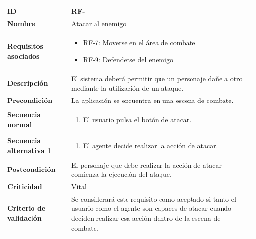 \begin{center}
	\begin{tabular}{ | p{4.7cm} | p{10cm} | } 
		\hline
		
		\textbf{ID} & RF-\arabic{contador_requisitos_funcionales}
		{contador_requisitos_funcionales} \\
		
		\hline 
		\textbf{Nombre} &
		Atacar al enemigo\\ 
		
		\hline
		\textbf{Requisitos asociados} & 
		\begin{itemize}
			\item RF-7: Moverse en el área de combate
			\item RF-9: Defenderse del enemigo
		\end{itemize}\\
		
		\hline
		\textbf{Descripción} & 
		El sistema deberá permitir que un personaje dañe a otro mediante la utilización de un ataque.\\
		
		\hline
		\textbf{Precondición} & 
		La aplicación se encuentra en una escena de combate.\\
		
		\hline
		\textbf{Secuencia normal} &
		\begin{enumerate}
			\item El usuario pulsa el botón de atacar.
		\end{enumerate}
		\\
		
		\hline
		\textbf{Secuencia alternativa 1} &
		\begin{enumerate}
			\item El agente decide realizar la acción de atacar.
		\end{enumerate}
		\\
		
		\hline
		\textbf{Postcondición} & 
		El personaje que debe realizar la acción de atacar comienza la ejecución del ataque.\\
		
		\hline 
		\textbf{Criticidad} &
		Vital\\
		
		\hline 
		\textbf{Criterio de validación} & 
		Se considerará este requisito como aceptado si tanto el usuario como el agente son capaces de atacar cuando deciden realizar esa acción dentro de la escena de combate.\\
		
		\hline
	\end{tabular}
\end{center}

